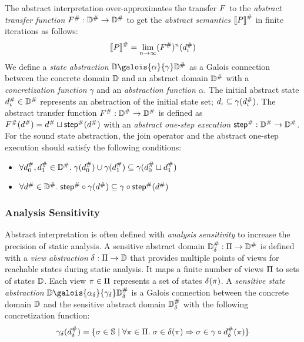 The abstract interpretation over-approximates the transfer $F$ to the
\textit{abstract transfer function} ${F}^{\#}: {\mathbb{D}}^{\#} \rightarrow {\mathbb{D}}^{\#}$
to get the \textit{abstract semantics} ${[\![{P}]\!]}^{\#}$ in finite iterations as
follows:
\[
    {[\![{P}]\!]}^{\#} = \underset{n \rightarrow
    \infty}{\lim}{({F}^{\#})^n({d}^{\#}_\iota)}\\
\]
We define a \textit{state abstraction} $\dom \galois{\alpha}{\gamma} \absdom$ as
a Galois connection between the concrete domain $\mathbb{D}$ and an abstract domain
${\mathbb{D}}^{\#}$ with a \textit{concretization function} $\gamma$ and an
\textit{abstraction function} $\alpha$.  The initial abstract state ${d}^{\#}_\iota
\in {\mathbb{D}}^{\#}$ represents an abstraction of the initial state set; $d_\iota
\subseteq \gamma({d}^{\#}_\iota)$.  The abstract transfer function ${F}^{\#}:
{\mathbb{D}}^{\#} \rightarrow {\mathbb{D}}^{\#}$ is defined as ${F}^{\#}({d}^{\#}) = {d}^{\#}
\sqcup {\textsf{step}}^{\#}({d}^{\#})$ with an \textit{abstract one-step execution}
${\textsf{step}}^{\#}: {\mathbb{D}}^{\#} \rightarrow {\mathbb{D}}^{\#}$.  For the sound state abstraction, the
join operator and the abstract one-step execution should satisfy the following
conditions:
\begin{itemize}
  \item $\forall {d}^{\#}_0, {d}^{\#}_1 \in {\mathbb{D}}^{\#}. \; \gamma({d}^{\#}_0) \cup
    \gamma({d}^{\#}_1) \subseteq \gamma({d}^{\#}_0 \sqcup {d}^{\#}_1)$
  \item $\forall {d}^{\#} \in {\mathbb{D}}^{\#}. \; {\textsf{step}}^{\#} \circ \gamma({d}^{\#}) \subseteq
    \gamma \circ {\textsf{step}}^{\#}({d}^{\#})$
\end{itemize}


\subsubsection{Analysis Sensitivity}

Abstract interpretation is often defined with \textit{analysis sensitivity} to
increase the precision of static analysis.  A sensitive abstract domain
${\mathbb{D}}^{\#}_\delta: \Pi \rightarrow {\mathbb{D}}^{\#}$ is defined with a \textit{view
abstraction} $\delta: \Pi \rightarrow \mathbb{D}$ that provides multiple points
of views for reachable states during static analysis.  It maps a finite number
of views $\Pi$ to sets of states $\mathbb{D}$. Each view $\pi \in \Pi$
represents a set of states $\delta(\pi)$.
A \textit{sensitive state abstraction} $\dom
\galois{\alpha_\viewmap}{\sgamma} \sabsdom$ is a Galois connection between
the concrete domain $\mathbb{D}$ and the sensitive abstract domain ${\mathbb{D}}^{\#}_\delta$ with the
following concretization function:
\[
  \gamma_\delta({d}^{\#}_\delta) = \{ \sigma \in \mathbb{S} \mid \forall \pi \in \Pi.
  \; \sigma \in \delta(\pi) \Rightarrow \sigma \in \gamma \circ {d}^{\#}_\delta(\pi) \}
\]

